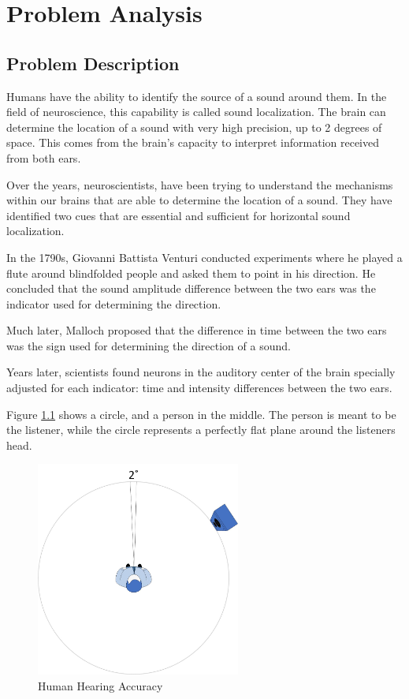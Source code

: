 \chapter{Problem Analysis}\label{ch:problemAnalysis}
\section{Problem Description}
Humans have the ability to identify the source of a sound around them. In the 
field of neuroscience, this capability is called sound localization. The brain
can determine the location of a sound with very high precision, up to 2 degrees 
of space. This comes from the brain's capacity to interpret information received
from both ears.

Over the years, neuroscientists, have been trying to understand the mechanisms 
within our brains that are able to determine the location of a sound. They have 
identified two cues that are essential and sufficient for horizontal sound
localization.

In the 1790s, Giovanni Battista Venturi conducted experiments where he played a 
flute around blindfolded people and asked them to point in his direction. 
He concluded that the sound amplitude difference between the two ears was the 
indicator used for determining the direction.

Much later, Malloch proposed that the difference in time between the two ears 
was the sign used for determining the direction of a sound.

Years later, scientists found neurons in the auditory center of the brain
specially adjusted for each indicator: time and intensity differences between 
the two ears.

\newpage

Figure \ref{fig:humanHearingAccuracy} shows a circle, and a person in the middle. 
The person is meant to be the listener, while the circle represents a perfectly 
flat plane around the listeners head.
 
\begin{figure}[htp]
	\centering
	\includegraphics[width = 0.6\textwidth]{Illustrations/personHearingAccuracy.jpg}
	\caption{Human Hearing Accuracy}
	\label{fig:humanHearingAccuracy}
\end{figure}

